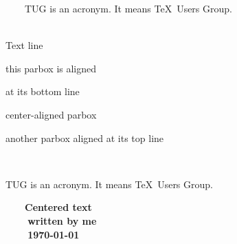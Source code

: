 \documentclass{article}
\begin{document}
\parbox{3cm}{\raggedright

    TUG is an acronym. It means \TeX\ Users Group.}\\[3mm]

Text line

\quad\parbox[b]{1.8cm}{this parbox is aligned

at its bottom line}

\quad\parbox{1.5cm}{center-aligned parbox}

\quad\parbox[t]{2cm}{another parbox aligned at its top line}\\[3mm]

\begin{minipage}{3cm}

TUG is an acronym. It means \TeX\ Users Group.\\[3mm]

\end{minipage}

{\centering

    \huge\bfseries Centered text \\

    \Large\normalfont written by me \\

    \normalsize\today

}
\end{document}
